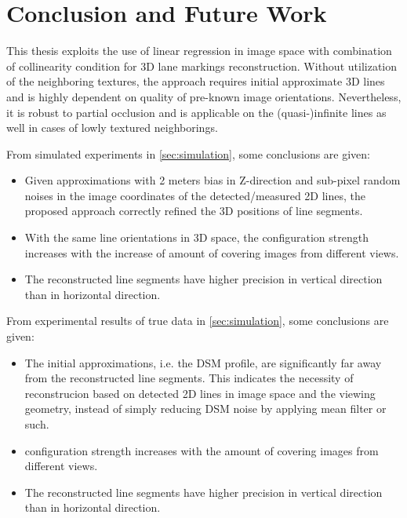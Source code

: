 
\chapter{Conclusion and Future Work}
\label{chap:conclusion}

This thesis exploits the use of linear regression in image space with combination of collinearity condition for 3D lane markings reconstruction. Without utilization of the neighboring textures, the approach requires initial approximate 3D lines and is highly dependent on quality of pre-known image orientations. Nevertheless, it is robust to partial occlusion and is applicable on the (quasi-)infinite lines as well in cases of lowly textured neighborings. 

From simulated experiments in \cref{sec:simulation}, some conclusions are given:
\begin{itemize}
	\item Given approximations with 2 meters bias in Z-direction and sub-pixel random noises in the image coordinates of the detected/measured 2D lines, the proposed approach correctly refined the 3D positions of line segments.
	
	\item With the same line orientations in 3D space, the configuration strength increases with the increase of amount of covering images from different views.
	
	\item The reconstructed line segments have higher precision in vertical direction than in horizontal direction.
\end{itemize}


From experimental results of true data in \cref{sec:simulation}, some conclusions are given:
\begin{itemize}
	\item The initial approximations, i.e. the DSM profile, are significantly far away from the reconstructed line segments. This indicates the necessity of reconstrucion based on detected 2D lines in image space and the viewing geometry, instead of simply reducing DSM noise by applying mean filter or such.
		
	\item  configuration strength increases with the amount of covering images from different views.
	\item The reconstructed line segments have higher precision in vertical direction than in horizontal direction.
\end{itemize}



